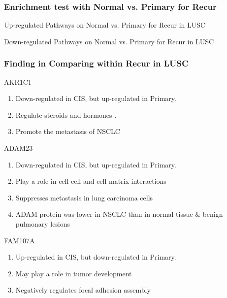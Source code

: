 \documentclass{beamer}
\begin{document}
    \begin{frame}
        \frametitle{Enrichment test with Normal vs. Primary for Recur}

        \begin{table}
            \caption{Up-regulated Pathways on Normal vs. Primary for Recur in LUSC}
            \resizebox{\linewidth}{!}
            {}
        \end{table}

        \begin{table}
            \caption{Down-regulated Pathways on Normal vs. Primary for Recur in LUSC}
            \resizebox{\linewidth}{!}
            {}
        \end{table}
    \end{frame}

    \begin{frame}[allowframebreaks]
        \frametitle{Finding in Comparing within Recur in LUSC}

        \begin{block}{AKR1C1}
            \begin{enumerate}
                \item Down-regulated in CIS, but up-regulated in Primary.
                \item Regulate steroids \cite{AKR1C1-1} and hormones \cite{AKR1C1-2}.
                \item Promote the metastasis of NSCLC \cite{AKR1C1-3}
            \end{enumerate}
        \end{block}

        \begin{block}{ADAM23}
            \begin{enumerate}
                \item Down-regulated in CIS, but up-regulated in Primary.
                \item Play a role in cell-cell and cell-matrix interactions \cite{ADAM23-1}
                \item Suppresses metastasis in lung carcinoma cells \cite{ADAM23-2}
                \item ADAM protein was lower in NSCLC than in normal tissue \& benign pulmonary lesions \cite{ADAM23-3}
            \end{enumerate}
        \end{block}

        \begin{block}{FAM107A}
            \begin{enumerate}
                \item Up-regulated in CIS, but down-regulated in Primary.
                \item May play a role in tumor development \cite{FAM107A1}
                \item Negatively regulates focal adhesion assembly \cite{FAM107A2}
            \end{enumerate}
        \end{block}
    \end{frame}
\end{document}
